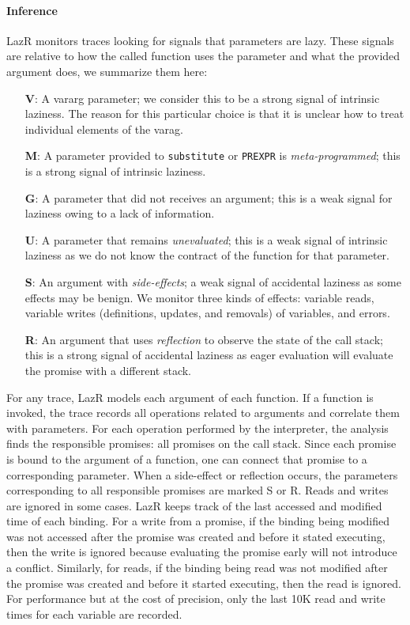 \documentclass[review,creen,acmsmall]{acmart}
\renewcommand{\c}[1]{\lstinline |#1|\xspace}
\newcommand{\lazr}{{\sf LazR}\xspace}
\begin{document}
\paragraph{Inference}
\lazr monitors traces looking for signals that parameters are lazy. These
signals are relative to how the called function uses the parameter and what the
provided argument does, we summarize them here:
\begin{itemize}
\item[{\bf V}:] A vararg parameter; we consider this to be a strong
  signal of intrinsic laziness. The reason for this particular choice is that it
  is unclear how to treat individual elements of the varag.
\item[{\bf M}:] A parameter provided to \c{substitute} or \c{PREXPR} is
  \emph{meta-programmed}; this is a strong signal of intrinsic laziness.
\item[{\bf G}:] A parameter that did not receives an argument; this is a weak
  signal for laziness owing to a lack of information.
\item[{\bf U}:] A parameter that remains \emph{unevaluated}; this is a weak
  signal of intrinsic laziness as we do not know the contract of the function
  for that parameter.
\item [{\bf S}:] An argument with \emph{side-effects}; a weak signal of
  accidental laziness as some effects may be benign. We monitor three kinds of
  effects: variable reads, variable writes (definitions, updates, and removals)
  of variables, and errors.
\item[{\bf R}:] An argument that uses \emph{reflection} to observe the state of
  the call stack; this is a strong signal of accidental laziness as eager
  evaluation will evaluate the promise with a different stack.
\end{itemize}

For any trace, \lazr models each argument of each function. If a function is
invoked, the trace records all operations related to arguments and correlate
them with parameters. For each operation performed by the interpreter, the
analysis finds the responsible promises: all promises on the call stack. Since
each promise is bound to the argument of a function, one can connect that
promise to a corresponding parameter. When a side-effect or reflection occurs,
the parameters corresponding to all responsible promises are marked S or R.
Reads and writes are ignored in some cases. \lazr keeps track of the last
accessed and modified time of each binding. For a write from a promise, if the
binding being modified was not accessed after the promise was created and before
it stated executing, then the write is ignored because evaluating the promise
early will not introduce a conflict. Similarly, for reads, if the binding being
read was not modified after the promise was created and before it started
executing, then the read is ignored. For performance but at the cost of
precision, only the last 10K read and write times for each variable are
recorded.
\end{document}
